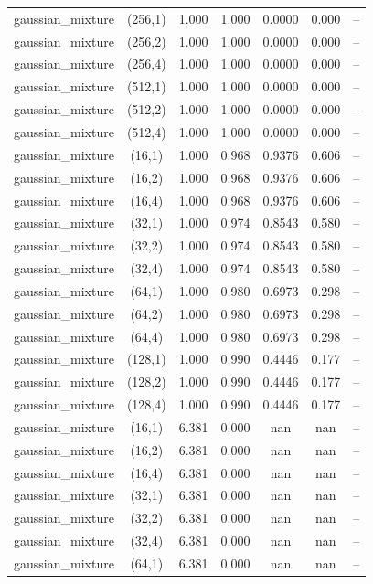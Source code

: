 \begin{tabular}{lcccccc}
gaussian\_mixture & (256,1) & 1.000 & 1.000 & 0.0000 & 0.000 & -- \\
gaussian\_mixture & (256,2) & 1.000 & 1.000 & 0.0000 & 0.000 & -- \\
gaussian\_mixture & (256,4) & 1.000 & 1.000 & 0.0000 & 0.000 & -- \\
gaussian\_mixture & (512,1) & 1.000 & 1.000 & 0.0000 & 0.000 & -- \\
gaussian\_mixture & (512,2) & 1.000 & 1.000 & 0.0000 & 0.000 & -- \\
gaussian\_mixture & (512,4) & 1.000 & 1.000 & 0.0000 & 0.000 & -- \\
gaussian\_mixture & (16,1) & 1.000 & 0.968 & 0.9376 & 0.606 & -- \\
gaussian\_mixture & (16,2) & 1.000 & 0.968 & 0.9376 & 0.606 & -- \\
gaussian\_mixture & (16,4) & 1.000 & 0.968 & 0.9376 & 0.606 & -- \\
gaussian\_mixture & (32,1) & 1.000 & 0.974 & 0.8543 & 0.580 & -- \\
gaussian\_mixture & (32,2) & 1.000 & 0.974 & 0.8543 & 0.580 & -- \\
gaussian\_mixture & (32,4) & 1.000 & 0.974 & 0.8543 & 0.580 & -- \\
gaussian\_mixture & (64,1) & 1.000 & 0.980 & 0.6973 & 0.298 & -- \\
gaussian\_mixture & (64,2) & 1.000 & 0.980 & 0.6973 & 0.298 & -- \\
gaussian\_mixture & (64,4) & 1.000 & 0.980 & 0.6973 & 0.298 & -- \\
gaussian\_mixture & (128,1) & 1.000 & 0.990 & 0.4446 & 0.177 & -- \\
gaussian\_mixture & (128,2) & 1.000 & 0.990 & 0.4446 & 0.177 & -- \\
gaussian\_mixture & (128,4) & 1.000 & 0.990 & 0.4446 & 0.177 & -- \\
gaussian\_mixture & (16,1) & 6.381 & 0.000 & nan & nan & -- \\
gaussian\_mixture & (16,2) & 6.381 & 0.000 & nan & nan & -- \\
gaussian\_mixture & (16,4) & 6.381 & 0.000 & nan & nan & -- \\
gaussian\_mixture & (32,1) & 6.381 & 0.000 & nan & nan & -- \\
gaussian\_mixture & (32,2) & 6.381 & 0.000 & nan & nan & -- \\
gaussian\_mixture & (32,4) & 6.381 & 0.000 & nan & nan & -- \\
gaussian\_mixture & (64,1) & 6.381 & 0.000 & nan & nan & -- \\

\end{tabular}
